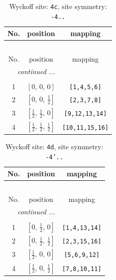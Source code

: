 \documentclass[fleqn,8pt]{jsarticle}
\begin{document}
\renewcommand{\arraystretch}{1.2}
\begin{longtable}{ccc}
\caption{Wyckoff site: {\tt 4c}, site symmetry: {\tt -4..}}
 \\
 \hline \hline
No. & position & mapping \\ \hline \endfirsthead

\multicolumn{2}{l}{\tablename\ \thetable{}} \\
 \hline \hline
No. & position & mapping \\ \hline \endhead

 \hline \hline
\multicolumn{2}{r}{\footnotesize\it continued ...} \\ \endfoot

 \hline \hline
\multicolumn{2}{r}{} \\ \endlastfoot

1 & $\left[ 0,\, 0,\, 0 \right]$ & {\tt [1,4,5,6]} \\ \hline
2 & $\left[ 0,\, 0,\, \frac{1}{2} \right]$ & {\tt [2,3,7,8]} \\ \hline
3 & $\left[ \frac{1}{2},\, \frac{1}{2},\, 0 \right]$ & {\tt [9,12,13,14]} \\ \hline
4 & $\left[ \frac{1}{2},\, \frac{1}{2},\, \frac{1}{2} \right]$ & {\tt [10,11,15,16]} \\
\end{longtable}
\renewcommand{\arraystretch}{1.2}
\begin{longtable}{ccc}
\caption{Wyckoff site: {\tt 4d}, site symmetry: {\tt -4'..}}
 \\
 \hline \hline
No. & position & mapping \\ \hline \endfirsthead

\multicolumn{2}{l}{\tablename\ \thetable{}} \\
 \hline \hline
No. & position & mapping \\ \hline \endhead

 \hline \hline
\multicolumn{2}{r}{\footnotesize\it continued ...} \\ \endfoot

 \hline \hline
\multicolumn{2}{r}{} \\ \endlastfoot

1 & $\left[ 0,\, \frac{1}{2},\, 0 \right]$ & {\tt [1,4,13,14]} \\ \hline
2 & $\left[ 0,\, \frac{1}{2},\, \frac{1}{2} \right]$ & {\tt [2,3,15,16]} \\ \hline
3 & $\left[ \frac{1}{2},\, 0,\, 0 \right]$ & {\tt [5,6,9,12]} \\ \hline
4 & $\left[ \frac{1}{2},\, 0,\, \frac{1}{2} \right]$ & {\tt [7,8,10,11]} \\
\end{longtable}
\end{document}
